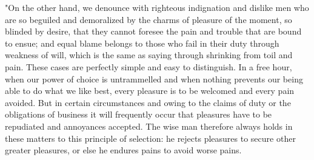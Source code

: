 "On the other hand, we denounce with righteous indignation and dislike men who are so beguiled and demoralized by the charms of pleasure of the moment, so blinded by desire, that they cannot foresee the pain and trouble that are bound to ensue; and equal blame belongs to those who fail in their duty through weakness of will, which is the same as saying through shrinking from toil and pain. These cases are perfectly simple and easy to distinguish. In a free hour, when our power of choice is untrammelled and when nothing prevents our being able to do what we like best, every pleasure is to be welcomed and every pain avoided. But in certain circumstances and owing to the claims of duty or the obligations of business it will frequently occur that pleasures have to be repudiated and annoyances accepted. The wise man therefore always holds in these matters to this principle of selection: he rejects pleasures to secure other greater pleasures, or else he endures pains to avoid worse pains.